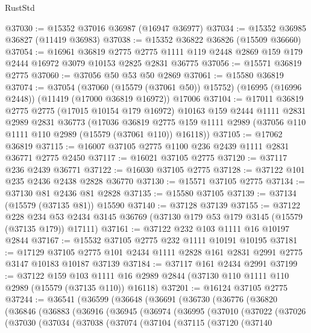 \begin{lexlean}{RustStd}
\begin{coremodule}
@37030 := @15352 @37016 @36987 (@16947 @36977)
@37034 := @15352 @36985 @36827 (@11419 @36983)
@37038 := @15352 @36822 @36826 (@15509 @36660)
@37054 := @16961
    @36819
    @2775
    @2775
    @1111
    @119
    @2448
    @2869
    @159
    @179
    @2444
    @16972
    @3079
    @10153
    @2825
    @2831
    @36775
@37056 := @15571 @36819 @2775
@37060 := @37056 @50 @53 @50 @2869
@37061 := @15580 @36819
@37074 := @37054
    (@37060 (@15579 (@37061 @50)) @15752)
    (@16995 (@16996 @2448))
    (@11419 (@17000 @36819 @16972))
    @17006
@37104 := @17011
    @36819
    @2775
    @2775
    (@17015 @10154 @179 @16972)
    @10163
    @159
    @2444
    @1111
    @2831
    @2989
    @2831
    @36773
    (@17036
      @36819
      @2775
      @159
      @1111
      @2989
      (@37056 @110 @1111 @110 @2989 (@15579 (@37061 @110)) @16118))
@37105 := @17062 @36819
@37115 := @16007 @37105 @2775 @1100 @236 @2439 @1111 @2831 @36771 @2775 @2450
@37117 := @16021 @37105 @2775
@37120 := @37117 @236 @2439 @36771
@37122 := @16030 @37105 @2775
@37128 := @37122 @101 @235 @2436 @2438 @2828 @36770
@37130 := @15571 @37105 @2775
@37134 := @37130 @81 @2436 @81 @2828
@37135 := @15580 @37105
@37139 := @37134 (@15579 (@37135 @81)) @15590
@37140 := @37128 @37139
@37155 := @37122
    @228
    @234
    @53
    @2434
    @3145
    @36769
    (@37130 @179 @53 @179 @3145 (@15579 (@37135 @179)) @17111)
@37161 := @37122 @232 @103 @1111 @16 @10197 @2844
@37167 := @15532 @37105 @2775 @232 @1111 @10191 @10195
@37181 := @17129
    @37105
    @2775
    @101
    @2434
    @1111
    @2828
    @161
    @2831
    @2991
    @2775
    @3147
    @10183
    @10187
    @37139
@37184 := @37117 @161 @2434 @2991
@37199 := @37122
    @159
    @103
    @1111
    @16
    @2989
    @2844
    (@37130 @110 @1111 @110 @2989 (@15579 (@37135 @110)) @16118)
@37201 := @16124 @37105 @2775
@37244 := @36541
    (@36599
      (@36648
        (@36691
          (@36730
            (@36776
              (@36820
                (@36846
                  (@36883
                    (@36916
                      (@36945
                        (@36974
                          (@36995
                            (@37010
                              (@37022
                                (@37026
                                  (@37030
                                    (@37034
                                      (@37038
                                        (@37074
                                          (@37104
                                            (@37115
                                              (@37120
                                                (@37140

\end{coremodule}
\end{lexlean}
